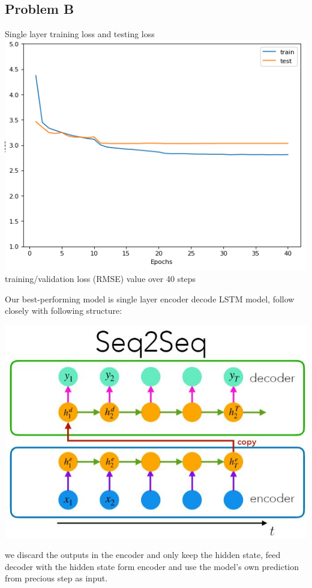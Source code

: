 \documentclass{article}
\begin{document}
\subsection{Problem B}
\begin{center}
    Single layer training loss and testing loss 
    \includegraphics[scale=0.7]{single_loss.png}\\
    training/validation loss (RMSE) value over 40 steps
\end{center}
Our best-performing model is single layer encoder decode LSTM model, follow closely with following structure:
\begin{center}
    \includegraphics[scale=0.7]{model.jpg}
\end{center}
we discard the outputs in the encoder and only keep the hidden state, feed decoder with the hidden state form encoder and use the model's own prediction from precious step as input.\\
\end{document}

